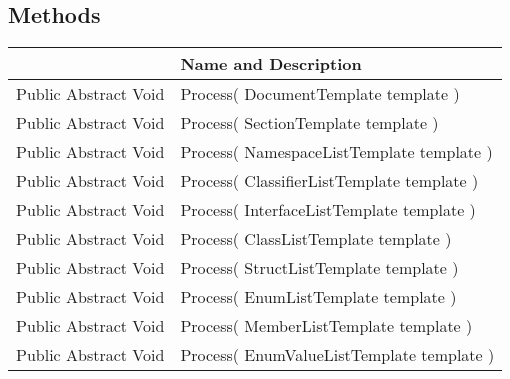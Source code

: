 \documentclass[11pt, oneside, a4paper]{book}
\begin{document}
\subsection{Methods}
\begin{center}
\begin{tabular}{| p{3cm} | p{12cm} | }
\hline
\textbf{ } & \textbf{ Name and Description}\\
\hline
 Public  Abstract  Void &  Process(\hypertarget{SoftwareEngineeringTools.{}Documentation.{}IApiDocTemplateProcessor.{}Process\_DocumentTemplate}{} DocumentTemplate  template  )\\
\hline
 Public  Abstract  Void &  Process(\hypertarget{SoftwareEngineeringTools.{}Documentation.{}IApiDocTemplateProcessor.{}Process\_SectionTemplate}{} SectionTemplate  template  )\\
\hline
 Public  Abstract  Void &  Process(\hypertarget{SoftwareEngineeringTools.{}Documentation.{}IApiDocTemplateProcessor.{}Process\_NamespaceListTemplate}{} NamespaceListTemplate  template  )\\
\hline
 Public  Abstract  Void &  Process(\hypertarget{SoftwareEngineeringTools.{}Documentation.{}IApiDocTemplateProcessor.{}Process\_ClassifierListTemplate}{} ClassifierListTemplate  template  )\\
\hline
 Public  Abstract  Void &  Process(\hypertarget{SoftwareEngineeringTools.{}Documentation.{}IApiDocTemplateProcessor.{}Process\_InterfaceListTemplate}{} InterfaceListTemplate  template  )\\
\hline
 Public  Abstract  Void &  Process(\hypertarget{SoftwareEngineeringTools.{}Documentation.{}IApiDocTemplateProcessor.{}Process\_ClassListTemplate}{} ClassListTemplate  template  )\\
\hline
 Public  Abstract  Void &  Process(\hypertarget{SoftwareEngineeringTools.{}Documentation.{}IApiDocTemplateProcessor.{}Process\_StructListTemplate}{} StructListTemplate  template  )\\
\hline
 Public  Abstract  Void &  Process(\hypertarget{SoftwareEngineeringTools.{}Documentation.{}IApiDocTemplateProcessor.{}Process\_EnumListTemplate}{} EnumListTemplate  template  )\\
\hline
 Public  Abstract  Void &  Process(\hypertarget{SoftwareEngineeringTools.{}Documentation.{}IApiDocTemplateProcessor.{}Process\_MemberListTemplate}{} MemberListTemplate  template  )\\
\hline
 Public  Abstract  Void &  Process(\hypertarget{SoftwareEngineeringTools.{}Documentation.{}IApiDocTemplateProcessor.{}Process\_EnumValueListTemplate}{} EnumValueListTemplate  template  )\\

\end{tabular}
\end{center}
\end{document}
